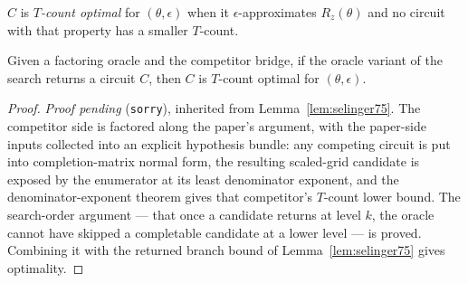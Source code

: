 \begin{definition}
  \label{def:rs_optimal}
  \leanok
  $C$ is \emph{$T$-count optimal} for $(\theta,\epsilon)$ when it
  $\epsilon$-approximates $R_z(\theta)$ and no circuit with that property has a
  smaller $T$-count.
\end{definition}

\begin{theorem}
  \label{thm:rs_optimal}
  \leanok
  Given a factoring oracle and the competitor bridge, if the oracle variant of
  the search returns a circuit $C$, then $C$ is $T$-count optimal for
  $(\theta,\epsilon)$.
\end{theorem}

\begin{proof}
  \emph{Proof pending} (\texttt{sorry}), inherited from
  Lemma~\ref{lem:selinger75}.  The competitor side is factored along the
  paper's argument, with the paper-side inputs collected into an explicit
  hypothesis bundle: any competing circuit is put into completion-matrix normal
  form, the resulting scaled-grid candidate is exposed by the enumerator at its
  least denominator exponent, and the denominator-exponent theorem gives that
  competitor's $T$-count lower bound.  The search-order argument --- that once a
  candidate returns at level $k$, the oracle cannot have skipped a completable
  candidate at a lower level --- is proved.  Combining it with the returned
  branch bound of Lemma~\ref{lem:selinger75} gives optimality.
\end{proof}
